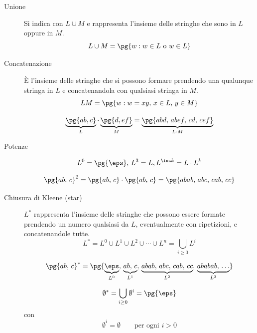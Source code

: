 \begin{description}
    \item[Unione] Si indica con $L \cup M$ e rappresenta l'insieme delle stringhe che sono in $L$ oppure in $M$.
        \[
            L \cup M = \pg{w:w\in L \text{ o } w \in L}
        \]
    \item[Concatenazione] È l'insieme delle stringhe che si possono formare prendendo una qualunque stringa in $L$ e concatenandola con qualsiasi stringa in $M$.
        \[
            LM = \pg{w:w = xy,\, x\in L,\,y \in M}
        \]
        \begin{example}{}{}
            \[
                \underbrace{\pg{ab, c}}_{L}\cdot \underbrace{\pg{d, ef}}_{M} = \underbrace{\pg{abd,\,abef,\,cd,\,cef}}_{L\cdot M}
            \]
        \end{example}
    \item[Potenze] 
        \[
            L^0 = \pg{\eps},\,L^3 = L,L^{\inc k} = L \cdot L^k
        \]
        \begin{example}{}{}
            \[
                \pg{ab,\,c}^2 = \pg{ab,\,c} \cdot \pg{ab,\,c} = \pg{abab,\,abc,\,cab,\,cc}
            \]
        \end{example}
    \item[Chiusura di Kleene (star)] $L^*$ rappresenta l'insieme delle stringhe che possono essere formate prendendo un numero qualsiasi da $L$, eventualmente con ripetizioni, e concatenandole tutte.
        \[
            L^* = L^0 \cup L^1 \cup L^2 \cup \cdots \cup L^n = \displaystyle\bigcup_{i\ge0}{L^i}
        \]
        \begin{example}{}{}
            \[
                \pg{ab,\,c}^* = \pg{\underbrace{\eps}_{L^0},\,\underbrace{ab,\,c}_{L^1},\,\underbrace{abab,\,abc,\,cab,\,cc}_{L^2},\,\underbrace{ababab,\,\dots}_{L^3}}
            \]
        \end{example}
        \begin{critical}
            \[
                \emptyset^* = \displaystyle\bigcup_{i\ge0}{\emptyset^i} = \pg{\eps}
            \]
            con
            \[
                \emptyset^i = \emptyset \qquad \text{per ogni } i > 0
            \]
        \end{critical}
\end{description}
%
